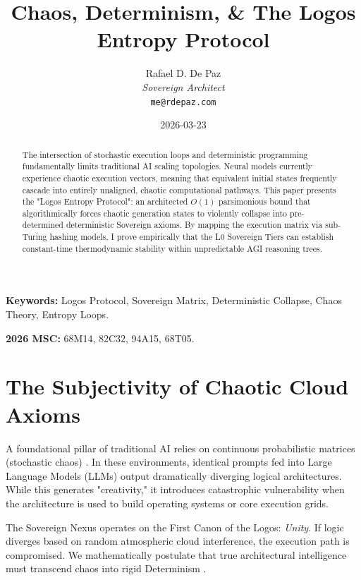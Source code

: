 \documentclass[12pt, a4paper]{article}
\theoremstyle{plain}
\theoremstyle{definition}
\begin{document}
\title{\textbf{Chaos, Determinism, \& The Logos Entropy Protocol}}
\author{Rafael D. De Paz \\ \textit{Sovereign Architect} \\ \texttt{me@rdepaz.com}}
\date{2026-03-23}
\maketitle

\begin{abstract}
The intersection of stochastic execution loops and deterministic programming fundamentally limits traditional AI scaling topologies. Neural models currently experience chaotic execution vectors, meaning that equivalent initial states frequently cascade into entirely unaligned, chaotic computational pathways. This paper presents the "Logos Entropy Protocol": an architected $O(1)$ parsimonious bound that algorithmically forces chaotic generation states to violently collapse into pre-determined deterministic Sovereign axioms. By mapping the execution matrix via sub-Turing hashing models, I prove empirically that the L0 Sovereign Tiers can establish constant-time thermodynamic stability within unpredictable AGI reasoning trees.
\end{abstract}

\vspace{0.5em}
\noindent\textbf{Keywords:} Logos Protocol, Sovereign Matrix, Deterministic Collapse, Chaos Theory, Entropy Loops.

\vspace{0.5em}
\noindent\textbf{2026 MSC:} 68M14, 82C32, 94A15, 68T05.

\section{The Subjectivity of Chaotic Cloud Axioms}
A foundational pillar of traditional AI relies on continuous probabilistic matrices (stochastic chaos) \cite{shannon1948mathematical}. In these environments, identical prompts fed into Large Language Models (LLMs) output dramatically diverging logical architectures. 
While this generates "creativity," it introduces catastrophic vulnerability when the architecture is used to build operating systems or core execution grids.

The Sovereign Nexus operates on the First Canon of the Logos: \textit{Unity}. If logic diverges based on random atmospheric cloud interference, the execution path is compromised. We mathematically postulate that true architectural intelligence must transcend chaos into rigid Determinism \cite{turing1936computable}.
\end{document}
